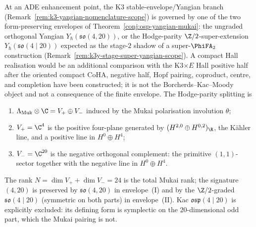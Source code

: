 \begin{conjecture}
\label{conj:k3-super-yangian}
\ClaimStatusConjectured
At an ADE enhancement point, the K$3$ stable-envelope/Yangian branch
(Remark~\ref{rem:k3-yangian-nomenclature-scope}) is governed by one
of the two form-preserving envelopes of
Theorem~\ref{conj:osp-yangian-mukai}: the ungraded orthogonal
Yangian $Y_\hbar(\mathfrak{so}(4, 20))$, or the Hodge-parity
$\Z/2$-super-extension $Y_\hbar(\mathfrak{so}(4 \mid 20))$ expected
as the stage-$2$ shadow of a super-$\PhiFA_2$ construction
(Remark~\ref{rem:k3y-stage-super-yangian-scope}). A compact Hall
realisation would be an additional comparison with the K3$\times E$
Hall positive half after the oriented compact CoHA, negative half,
Hopf pairing, coproduct, centre, and completion have been constructed;
it is not the Borcherds--Kac--Moody object and not a consequence of
the finite envelope. The Hodge-parity
splitting is
\begin{enumerate}[label=\textup{(\roman*)}]
\item $\Lambda_{\mathrm{Muk}} \otimes \C = V_+ \oplus V_-$ induced by
 the Mukai polarisation involution $\theta$;
\item $V_+ = \C^4$ is the positive four-plane generated by
 \((H^{2,0}\oplus H^{0,2})_\R\), the K\"ahler line, and a positive line
 in \(H^0\oplus H^4\);
\item $V_- = \C^{20}$ is the negative orthogonal complement: the
 primitive $(1,1)$-sector together with the negative line in
 \(H^0\oplus H^4\).
\end{enumerate}
The rank $N = \dim V_+ + \dim V_- = 24$ is the total Mukai rank;
the signature $(4, 20)$ is preserved by $\mathfrak{so}(4, 20)$ in
envelope~(I) and by the $\Z/2$-graded $\mathfrak{so}(4 \mid 20)$
(symmetric on both parts) in envelope~(II). Kac
$\mathfrak{osp}(4 \mid 20)$ is explicitly excluded: its defining
form is symplectic on the $20$-dimensional odd part, which the
Mukai pairing is not.
\end{conjecture}

